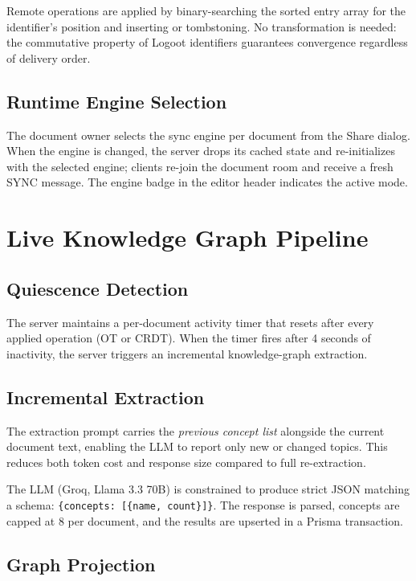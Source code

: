 \documentclass[conference]{IEEEtran}
\begin{document}
Remote operations are applied by binary-searching the sorted entry array for the identifier's position and inserting or tombstoning. No transformation is needed: the commutative property of Logoot identifiers guarantees convergence regardless of delivery order.

\subsection{Runtime Engine Selection}

The document owner selects the sync engine per document from the Share dialog. When the engine is changed, the server drops its cached state and re-initializes with the selected engine; clients re-join the document room and receive a fresh SYNC message. The engine badge in the editor header indicates the active mode.

\section{Live Knowledge Graph Pipeline}\label{sec:kg}

\subsection{Quiescence Detection}

The server maintains a per-document activity timer that resets after every applied operation (OT or CRDT). When the timer fires after 4 seconds of inactivity, the server triggers an incremental knowledge-graph extraction.

\subsection{Incremental Extraction}

The extraction prompt carries the \emph{previous concept list} alongside the current document text, enabling the LLM to report only new or changed topics. This reduces both token cost and response size compared to full re-extraction.

The LLM (Groq, Llama 3.3 70B) is constrained to produce strict JSON matching a schema: \texttt{\{concepts: [\{name, count\}]\}}. The response is parsed, concepts are capped at 8 per document, and the results are upserted in a Prisma transaction.

\subsection{Graph Projection}
\end{document}

